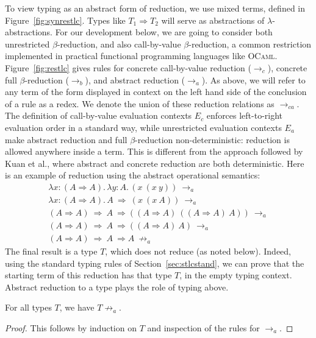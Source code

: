 \documentclass{LMCS}
\newcommand{\To}[0]{\Rightarrow}
\begin{document}
To view typing as an abstract form of reduction, we use mixed terms,
defined in Figure~\ref{fig:synrestlc}.  Types like $T_1\To T_2$ will
serve as abstractions of $\lambda$-abstractions.  For our development
below, we are going to consider both unrestricted $\beta$-reduction,
and also call-by-value $\beta$-reduction, a common restriction
implemented in practical functional programming languages like
\textsc{OCaml}.  Figure~\ref{fig:restlc} gives rules for concrete
call-by-value reduction ($\to_c$), concrete full $\beta$-reduction
($\to_b$), and abstract reduction ($\to_a$).  As above, we will refer
to any term of the form displayed in context on the left hand side of
the conclusion of a rule as a redex. We denote the union of these
reduction relations as $\to_{ca}$.  The definition of call-by-value
evaluation contexts $E_c$ enforces left-to-right evaluation order in a
standard way, while unrestricted evaluation contexts $E_a$ make
abstract reduction and full $\beta$-reduction non-deterministic:
reduction is allowed anywhere inside a term.  This is different from
the approach followed by Kuan et al., where abstract and concrete
reduction are both deterministic.  Here is an example of reduction using
the abstract operational semantics:
\[
\begin{array}{l}
\lambda x:(A\To A).\,\lambda y:A.\, (x\ (x\ y)) \ \to_a \\
\lambda x:(A\To A).\, A\ \To\ (x\ (x\ A)) \ \to_a \\
(A\To A)\ \To\ A\ \To ((A\To A)\ ((A\To A)\ A)) \ \to_a \\
(A\To A)\ \To\ A\ \To ((A\To A)\ A) \ \to_a \\
(A\To A)\ \To\ A\ \To A\ \not\to_a
\end{array}
\]
\noindent The final result is a type $T$, which does not reduce (as
noted below).  Indeed, using the standard typing rules of
Section~\ref{sec:stlcstand}, we can prove that the starting term of
this reduction has that type $T$, in the empty typing context.
Abstract reduction to a type plays the role of typing above.

\begin{lem}
\label{lem:tpnorm}
For all types $T$, we have $T\not\to_a$.
\end{lem}
\begin{proof} This follows by induction on $T$ and inspection of the rules for $\to_a$.
\end{proof}
\end{document}
